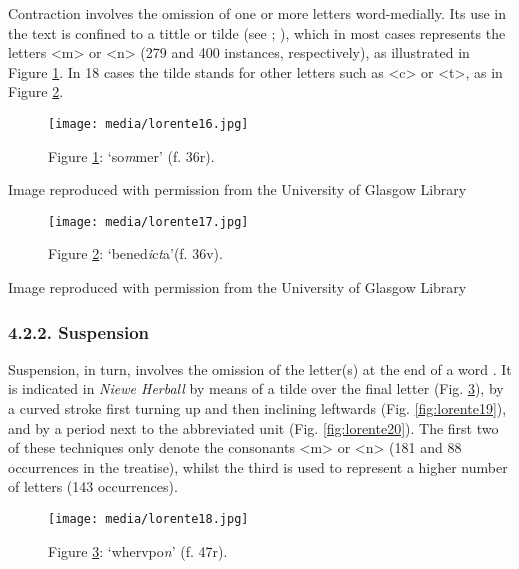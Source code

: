 \documentclass{article}
\begin{document}
Contraction involves the omission of one or more letters word-medially.
Its use in the text is confined to a tittle or tilde (see \cite[119--120]{tannenbaum_handwriting_1930}; \cite[118]{calle-martin_corpus-based_2021}), which in most cases represents
the letters \textless m\textgreater{} or \textless n\textgreater{} (279
and 400 instances, respectively), as illustrated in Figure \ref{fig:lorente16}. In 18 cases the tilde stands for other letters such as
\textless c\textgreater{} or \textless t\textgreater, as in Figure \ref{fig:lorente17}.

\begin{figure}[H]
  \centering
    \texttt{[image: media/lorente16.jpg]}
    \caption{Figure \ref{fig:lorente16}: `so\emph{m}mer' (f. 36r).}
    \label{fig:lorente16}
  \end{figure}


 Image reproduced with permission from the University of Glasgow Library 


 
  \begin{figure}
    \texttt{[image: media/lorente17.jpg]}
    \caption{Figure \ref{fig:lorente17}: `bened\emph{i}c\emph{t}a'(f. 36v).}
    \label{fig:lorente17}
\end{figure}


 Image reproduced with permission from the University of Glasgow Library 


 
\subsubsection{4.2.2. Suspension}

Suspension, in turn, involves the omission of the letter(s) at the end
of a word \citep[124]{tannenbaum_handwriting_1930}. It is indicated in \emph{Niewe
Herball} by means of a tilde over the final letter (Fig. \ref{fig:lorente18}), by a
curved stroke first turning up and then inclining leftwards (Fig. \ref{fig:lorente19}),
and by a period next to the abbreviated unit (Fig. \ref{fig:lorente20}). The first two
of these techniques only denote the consonants \textless m\textgreater{}
or \textless n\textgreater{} (181 and 88 occurrences in the treatise),
whilst the third is used to represent a higher number of letters (143
occurrences).

\begin{figure}[H]
  \centering
    \texttt{[image: media/lorente18.jpg]}
    \caption{Figure \ref{fig:lorente18}: `whervpo\emph{n}' (f. 47r).}
    \label{fig:lorente18}
  \end{figure}
\end{document}
